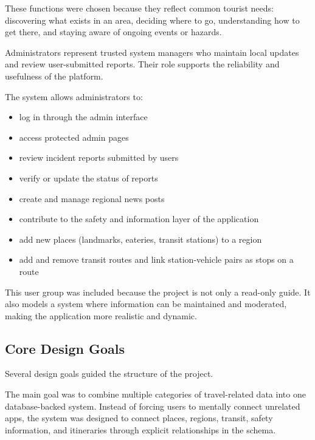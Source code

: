 These functions were chosen because they reflect common tourist needs: discovering what exists in an area, deciding where to go, understanding how to get there, and staying aware of ongoing events or hazards.


Administrators represent trusted system managers who maintain local updates and review user-submitted reports. Their role supports the reliability and usefulness of the platform.

The system allows administrators to:
\begin{itemize}
    \item log in through the admin interface
    \item access protected admin pages
    \item review incident reports submitted by users
    \item verify or update the status of reports
    \item create and manage regional news posts
    \item contribute to the safety and information layer of the application
    \item add new places (landmarks, eateries, transit stations) to a region
    \item add and remove transit routes and link station-vehicle pairs as stops on a route
\end{itemize}

This user group was included because the project is not only a read-only guide. It also models a system where information can be maintained and moderated, making the application more realistic and dynamic.

\subsection{Core Design Goals}

Several design goals guided the structure of the project.


The main goal was to combine multiple categories of travel-related data into one database-backed system. Instead of forcing users to mentally connect unrelated apps, the system was designed to connect places, regions, transit, safety information, and itineraries through explicit relationships in the schema.



